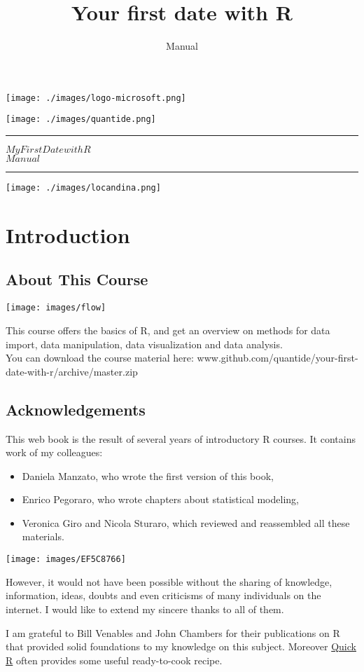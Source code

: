 \documentclass[]{book}
\title{Your first date with R}
\subtitle{Manual}
\author{}
\date{}
\providecommand{\tightlist}{%
  \setlength{\itemsep}{0pt}\setlength{\parskip}{0pt}}
\def\tightlist{}
\def\maketitle{%
  \null
  \thispagestyle{empty}%
   \begin{flushleft}\texttt{[image: ./images/logo-microsoft.png]}\end{flushleft}
  \vspace{-2cm}
  \begin{flushright}\texttt{[image: ./images/quantide.png]}\end{flushright}
  \vskip 5cm
  \hrule height 2pt
  \begin{center} \par \huge \strut \textbf{$My  First  Date  with  R$}\\ $Manual$ \par  \end{center}
  \vspace{0.5cm}
  \hrule height 2pt
  \vspace{0.5cm}
  \texttt{[image: ./images/locandina.png]}
  \clearpage
}
\begin{document}
\maketitle

{
\setcounter{tocdepth}{1}
\tableofcontents
}
\chapter{Introduction}\label{introduction}

\section{About This Course}\label{about-this-course}

\texttt{[image: images/flow]}

This course offers the basics of R, and get an overview on methods for
data import, data manipulation, data visualization and data analysis.\\
You can download the course material here:
www.github.com/quantide/your-first-date-with-r/archive/master.zip

\clearpage

\section{Acknowledgements}\label{acknowledgements}

This web book is the result of several years of introductory R courses.
It contains work of my colleagues:

\begin{itemize}
\tightlist
\item
  Daniela Manzato, who wrote the first version of this book,
\item
  Enrico Pegoraro, who wrote chapters about statistical modeling,
\item
  Veronica Giro and Nicola Sturaro, which reviewed and reassembled all
  these materials.
\end{itemize}

\texttt{[image: images/EF5C8766]}

However, it would not have been possible without the sharing of
knowledge, information, ideas, doubts and even criticisms of many
individuals on the internet. I would like to extend my sincere thanks to
all of them.

I am grateful to Bill Venables and John Chambers for their publications
on R that provided solid foundations to my knowledge on this subject.
Moreover \href{http://www.statmethods.net/}{Quick R} often provides some
useful ready-to-cook recipe.
\end{document}
